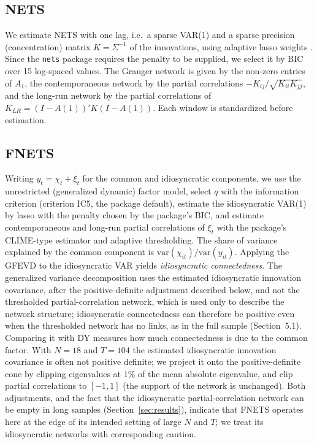 \subsection{NETS}
We estimate NETS with one lag, i.e.\ a sparse VAR(1) and a sparse precision (concentration) matrix $K=\Sigma^{-1}$ of the innovations, using adaptive lasso weights \citep{zou2006adaptive, peng2009space}. Since the \texttt{nets} package requires the penalty to be supplied, we select it by BIC over 15 log-spaced values. The Granger network is given by the non-zero entries of $A_1$, the contemporaneous network by the partial correlations $-K_{ij}/\sqrt{K_{ii}K_{jj}}$, and the long-run network by the partial correlations of $K_{LR} = (I-A(1))'K(I-A(1))$. Each window is standardized before estimation.

\subsection{FNETS}
Writing $y_t = \chi_t + \xi_t$ for the common and idiosyncratic components, we use the unrestricted (generalized dynamic) factor model, select $q$ with the \citet{hallin2007determining} information criterion (criterion IC5, the package default), estimate the idiosyncratic VAR(1) by lasso with the penalty chosen by the package's BIC, and estimate contemporaneous and long-run partial correlations of $\xi_t$ with the package's CLIME-type estimator \citep{cai2016estimating} and adaptive thresholding. The share of variance explained by the common component is $\mathrm{var}(\chi_{it})/\mathrm{var}(y_{it})$. Applying the GFEVD to the idiosyncratic VAR yields \emph{idiosyncratic connectedness}. The generalized variance decomposition uses the estimated idiosyncratic innovation covariance, after the positive-definite adjustment described below, and not the thresholded partial-correlation network, which is used only to describe the network structure; idiosyncratic connectedness can therefore be positive even when the thresholded network has no links, as in the full sample (Section~5.1). Comparing it with DY measures how much connectedness is due to the common factor. With $N=18$ and $T=104$ the estimated idiosyncratic innovation covariance is often not positive definite; we project it onto the positive-definite cone by clipping eigenvalues at 1\% of the mean absolute eigenvalue, and clip partial correlations to $[-1,1]$ (the support of the network is unchanged). Both adjustments, and the fact that the idiosyncratic partial-correlation network can be empty in long samples (Section~\ref{sec:results}), indicate that FNETS operates here at the edge of its intended setting of large $N$ and $T$; we treat its idiosyncratic networks with corresponding caution.


